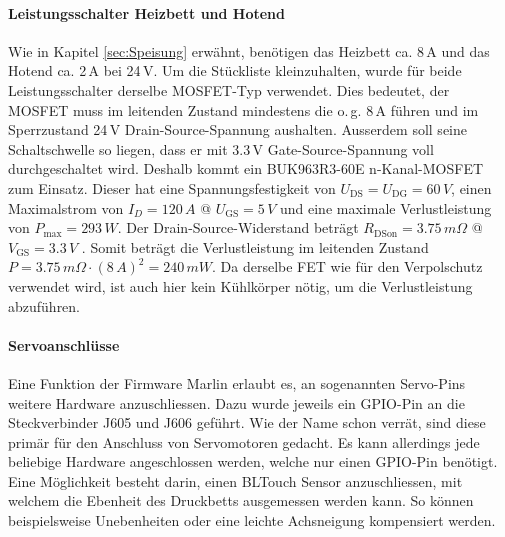 \paragraph{Leistungsschalter Heizbett und Hotend}
Wie in Kapitel \ref{sec:Speisung} erwähnt, benötigen das Heizbett ca. 8\,A und das Hotend ca. 2\,A bei 24\,V. Um die Stückliste kleinzuhalten, wurde für beide Leistungsschalter derselbe MOSFET-Typ verwendet.
Dies bedeutet, der MOSFET muss im leitenden Zustand mindestens die o.\,g. 8\,A führen und im Sperrzustand 24\,V Drain-Source-Spannung aushalten. Ausserdem soll seine Schaltschwelle so liegen, dass er mit 3.3\,V Gate-Source-Spannung voll durchgeschaltet wird. Deshalb kommt ein BUK963R3-60E n-Kanal-MOSFET zum Einsatz. Dieser hat eine Spannungsfestigkeit von $U_{\text{DS}}=U_{\text{DG}}=60\,\si{V}$, einen Maximalstrom von $I_D=120\,\si{A}$ @ $U_{\text{GS}}=5\,\si{V}$ und eine maximale Verlustleistung von $P_{\text{max}}=293\,\si{W}$.
Der Drain-Source-Widerstand beträgt $R_{\text{DSon}}=3.75\,\si{m\Omega}$ @ $V_{\text{GS}}=3.3 \,\si{V}$ \cite{BUK963R3}.
Somit beträgt die Verlustleistung im leitenden Zustand $P=3.75\,\si{m\Omega}\cdot(8\,\si{A})^2 = 240\,\si{mW}$. Da derselbe FET wie für den Verpolschutz verwendet wird, ist auch hier kein Kühlkörper nötig, um die Verlustleistung abzuführen. \\

\paragraph{Servoanschlüsse}
Eine Funktion der Firmware Marlin erlaubt es, an sogenannten Servo-Pins weitere Hardware anzuschliessen. Dazu wurde jeweils ein GPIO-Pin an die Steckverbinder J605 und J606 geführt.
Wie der Name schon verrät, sind diese primär für den Anschluss von Servomotoren gedacht.
Es kann allerdings jede beliebige Hardware angeschlossen werden, welche nur einen GPIO-Pin benötigt. Eine Möglichkeit besteht darin, einen BLTouch Sensor anzuschliessen, mit welchem die Ebenheit des Druckbetts ausgemessen werden kann. So können beispielsweise Unebenheiten oder eine leichte Achsneigung kompensiert werden.
\vspace{5mm}